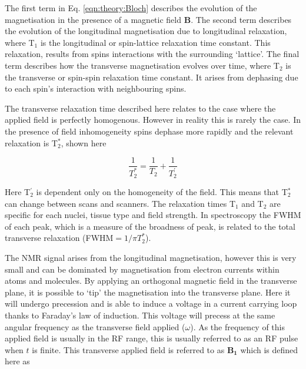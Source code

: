 The first term in Eq. \ref{eqn:theory:Bloch} describes the evolution of the magnetisation in the presence of a magnetic field $\mathbf{B}$. The second term describes the evolution of the longitudinal magnetisation due to longitudinal relaxation, where T$_1$ is the longitudinal or spin-lattice relaxation time constant. This relaxation, results from spins interactions with the surrounding `lattice'. The final term describes how the transverse magnetisation evolves over time, where T$_2$ is the transverse or spin-spin relaxation time constant. It arises from dephasing due to each spin's interaction with neighbouring spins. 

The transverse relaxation time described here relates to the case where the applied field is perfectly homogenous. However in reality this is rarely the case. In the presence of field inhomogeneity spins dephase more rapidly and the relevant relaxation is T$_2^*$, shown here

\begin{equation}
    \frac{1}{T_2^*} = \frac{1}{T_2} + \frac{1}{T_2^{'}}
    \label{eqn:theory:trans}
\end{equation}

Here T$_2^{'}$ is dependent only on the homogeneity of the field. This means that T$_2^*$ can change between scans and scanners. The relaxation times T$_1$ and T$_2$ are specific for each nuclei, tissue type and field strength. In spectroscopy the \ac{FWHM} of each peak, which is a measure of the broadness of peak, is related to the total transverse relaxation (\ac{FWHM}$ = 1 / \pi T_2^*$). 


The \ac{NMR} signal arises from the longitudinal magnetisation, however this is very small and can be dominated by magnetisation from electron currents within atoms and molecules. By applying an orthogonal magnetic field in the transverse plane, it is possible to `tip' the magnetisation into the transverse plane. Here it will undergo precession and is able to induce a voltage in a current carrying loop thanks to Faraday's law of induction. This voltage will precess at the same angular frequency as the transverse field applied ($\omega$). As the frequency of this applied field is usually in the \ac{RF} range, this is usually referred to as an \ac{RF} pulse when $t$ is finite. This transverse applied field is referred to as $\mathbf{B_1}$ which is defined here as

